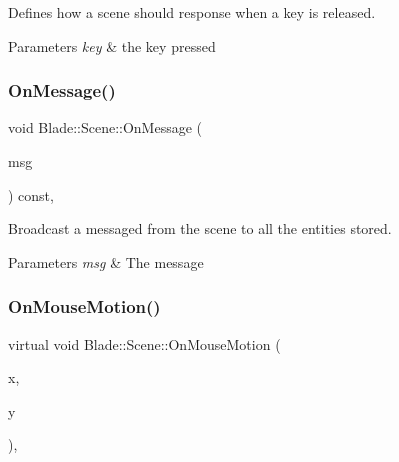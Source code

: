 Defines how a scene should response when a key is released. 


\begin{DoxyParams}{Parameters}
{\em key} & the key pressed \\
\hline
\end{DoxyParams}
\mbox{\label{class_blade_1_1_scene_ac49cdbb30d13096320971ef9389d0a54}} 
\subsubsection{\texorpdfstring{On\+Message()}{OnMessage()}}
{\footnotesize\ttfamily void Blade\+::\+Scene\+::\+On\+Message (\begin{DoxyParamCaption}\item[{const \hyperlink{class_blade_1_1_ref_counted_container}{Message\+Container}$<$ std\+::string $>$ \&}]{msg }\end{DoxyParamCaption}) const\hspace{0.3cm}{\ttfamily [virtual]}, {\ttfamily [noexcept]}}



Broadcast a messaged from the scene to all the entities stored. 


\begin{DoxyParams}{Parameters}
{\em msg} & The message \\
\hline
\end{DoxyParams}
\mbox{\label{class_blade_1_1_scene_aa0296f990fc1cacbfc97f657d6cb958f}} 
\subsubsection{\texorpdfstring{On\+Mouse\+Motion()}{OnMouseMotion()}}
{\footnotesize\ttfamily virtual void Blade\+::\+Scene\+::\+On\+Mouse\+Motion (\begin{DoxyParamCaption}\item[{int}]{x,  }\item[{int}]{y }\end{DoxyParamCaption})\hspace{0.3cm}{\ttfamily [pure virtual]}, {\ttfamily [noexcept]}}




